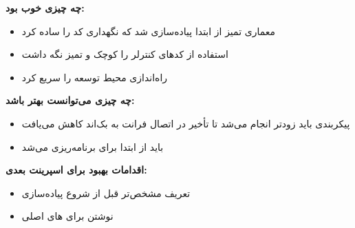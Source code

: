 \documentclass[12pt, a4paper]{article}
\begin{document}
\textbf{چه چیزی خوب بود:}
\begin{itemize}[rightmargin=0.5cm]
  \item معماری تمیز از ابتدا پیاده‌سازی شد که نگهداری کد را ساده کرد
  \item استفاده از  کدهای کنترلر را کوچک و تمیز نگه داشت
  \item {} راه‌اندازی محیط توسعه را سریع کرد
\end{itemize}

\textbf{چه چیزی می‌توانست بهتر باشد:}
\begin{itemize}[rightmargin=0.5cm]
  \item پیکربندی  باید زودتر انجام می‌شد تا تأخیر در اتصال فرانت به بک‌اند کاهش می‌یافت
  \item باید از ابتدا برای  برنامه‌ریزی می‌شد
\end{itemize}

\textbf{اقدامات بهبود برای اسپرینت بعدی:}
\begin{itemize}[rightmargin=0.5cm]
  \item تعریف مشخص‌تر  قبل از شروع پیاده‌سازی
  \item نوشتن  برای های اصلی
\end{itemize}
\end{document}
